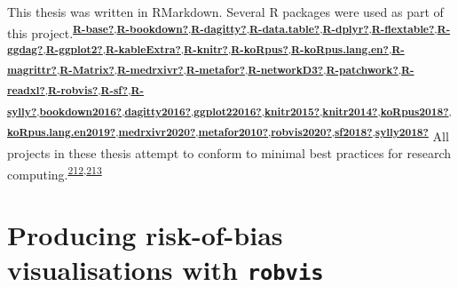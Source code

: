 \documentclass[a4paper, twoside]{templates/ociamthesis}
\begin{document}
This thesis was written in RMarkdown. Several R packages were used as part of this project.\textsuperscript{\protect\hyperlink{ref-R-base}{\textbf{R-base?}},\protect\hyperlink{ref-R-bookdown}{\textbf{R-bookdown?}},\protect\hyperlink{ref-R-dagitty}{\textbf{R-dagitty?}},\protect\hyperlink{ref-R-data.table}{\textbf{R-data.table?}},\protect\hyperlink{ref-R-dplyr}{\textbf{R-dplyr?}},\protect\hyperlink{ref-R-flextable}{\textbf{R-flextable?}},\protect\hyperlink{ref-R-ggdag}{\textbf{R-ggdag?}},\protect\hyperlink{ref-R-ggplot2}{\textbf{R-ggplot2?}},\protect\hyperlink{ref-R-kableExtra}{\textbf{R-kableExtra?}},\protect\hyperlink{ref-R-knitr}{\textbf{R-knitr?}},\protect\hyperlink{ref-R-koRpus}{\textbf{R-koRpus?}},\protect\hyperlink{ref-R-koRpus.lang.en}{\textbf{R-koRpus.lang.en?}},\protect\hyperlink{ref-R-magrittr}{\textbf{R-magrittr?}},\protect\hyperlink{ref-R-Matrix}{\textbf{R-Matrix?}},\protect\hyperlink{ref-R-medrxivr}{\textbf{R-medrxivr?}},\protect\hyperlink{ref-R-metafor}{\textbf{R-metafor?}},\protect\hyperlink{ref-R-networkD3}{\textbf{R-networkD3?}},\protect\hyperlink{ref-R-patchwork}{\textbf{R-patchwork?}},\protect\hyperlink{ref-R-readxl}{\textbf{R-readxl?}},\protect\hyperlink{ref-R-robvis}{\textbf{R-robvis?}},\protect\hyperlink{ref-R-sf}{\textbf{R-sf?}},\protect\hyperlink{ref-R-sylly}{\textbf{R-sylly?}},\protect\hyperlink{ref-bookdown2016}{\textbf{bookdown2016?}},\protect\hyperlink{ref-dagitty2016}{\textbf{dagitty2016?}},\protect\hyperlink{ref-ggplot22016}{\textbf{ggplot22016?}},\protect\hyperlink{ref-knitr2015}{\textbf{knitr2015?}},\protect\hyperlink{ref-knitr2014}{\textbf{knitr2014?}},\protect\hyperlink{ref-koRpus2018}{\textbf{koRpus2018?}},\protect\hyperlink{ref-koRpus.lang.en2019}{\textbf{koRpus.lang.en2019?}},\protect\hyperlink{ref-medrxivr2020}{\textbf{medrxivr2020?}},\protect\hyperlink{ref-metafor2010}{\textbf{metafor2010?}},\protect\hyperlink{ref-robvis2020}{\textbf{robvis2020?}},\protect\hyperlink{ref-sf2018}{\textbf{sf2018?}},\protect\hyperlink{ref-sylly2018}{\textbf{sylly2018?}}}
All projects in these thesis attempt to conform to minimal best practices for research computing.\textsuperscript{\protect\hyperlink{ref-wilson2014}{212},\protect\hyperlink{ref-wilson2017}{213}}

\hypertarget{appendix-robvis}{%
\section{\texorpdfstring{Producing risk-of-bias visualisations with \texttt{robvis}}{Producing risk-of-bias visualisations with robvis}}\label{appendix-robvis}}
\end{document}
